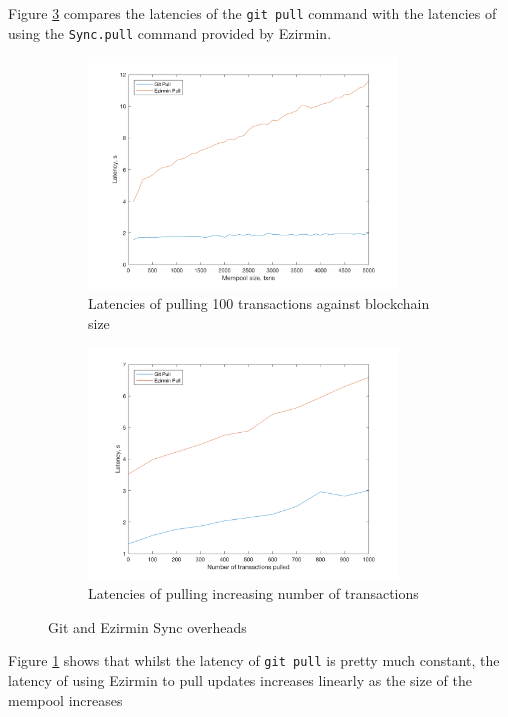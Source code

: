 \documentclass[12pt,a4paper,twoside,openright]{report}
\begin{document}
	Figure \ref{figs:gitoverheads} compares the latencies of the \texttt{git pull} command with the latencies of using the \texttt{Sync.pull} command provided by Ezirmin.
	\begin{figure}
		\centering
		\begin{subfigure}[t]{\textwidth}
			\centering
			\includegraphics[width=0.9\textwidth]{figs/gitlatencies.png}
			\caption{Latencies of pulling 100 transactions against blockchain size}
			\label{figs:gitreposize}
		\end{subfigure}
		
		\begin{subfigure}[t]{\textwidth}
			\centering
			\includegraphics[width=0.9\textwidth]{figs/gitlatenciespullsize.png}
			\caption{Latencies of pulling increasing number of transactions}
			\label{figs:gitpullsize}
		\end{subfigure}
		\caption{Git and Ezirmin Sync overheads}
		\label{figs:gitoverheads}
	\end{figure}
	Figure \ref{figs:gitreposize} shows that whilst the latency of \texttt{git pull} is pretty much constant, the latency of using Ezirmin to pull updates increases linearly as the size of the mempool increases
\end{document}
